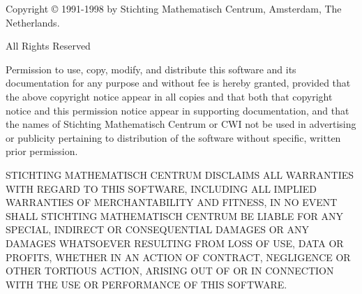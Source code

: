 Copyright \copyright{} 1991-1998 by Stichting Mathematisch Centrum,
Amsterdam, The Netherlands.

\begin{center}
All Rights Reserved
\end{center}

Permission to use, copy, modify, and distribute this software and its
documentation for any purpose and without fee is hereby granted,
provided that the above copyright notice appear in all copies and that
both that copyright notice and this permission notice appear in
supporting documentation, and that the names of Stichting Mathematisch
Centrum or CWI not be used in advertising or publicity pertaining to
distribution of the software without specific, written prior permission.

STICHTING MATHEMATISCH CENTRUM DISCLAIMS ALL WARRANTIES WITH REGARD TO
THIS SOFTWARE, INCLUDING ALL IMPLIED WARRANTIES OF MERCHANTABILITY AND
FITNESS, IN NO EVENT SHALL STICHTING MATHEMATISCH CENTRUM BE LIABLE
FOR ANY SPECIAL, INDIRECT OR CONSEQUENTIAL DAMAGES OR ANY DAMAGES
WHATSOEVER RESULTING FROM LOSS OF USE, DATA OR PROFITS, WHETHER IN AN
ACTION OF CONTRACT, NEGLIGENCE OR OTHER TORTIOUS ACTION, ARISING OUT
OF OR IN CONNECTION WITH THE USE OR PERFORMANCE OF THIS SOFTWARE.
